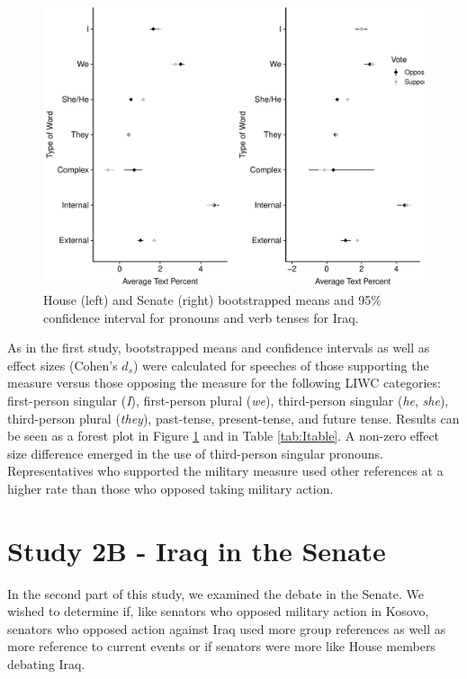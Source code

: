 \documentclass[english,,man]{apa6}
\theoremstyle{definition}
\theoremstyle{definition}
\theoremstyle{definition}
\theoremstyle{remark}
\begin{document}
\begin{figure}
\centering
\includegraphics{Language_of_War_Markdown_KJ_files/figure-latex/Ipic-1.pdf}
\caption{\label{fig:Ipic}House (left) and Senate (right) bootstrapped means
and 95\% confidence interval for pronouns and verb tenses for Iraq.}
\end{figure}

As in the first study, bootstrapped means and confidence intervals as
well as effect sizes (Cohen's \(d_s\)) were calculated for speeches of
those supporting the measure versus those opposing the measure for the
following LIWC categories: first-person singular (\emph{I}),
first-person plural (\emph{we}), third-person singular (\emph{he},
\emph{she}), third-person plural (\emph{they}), past-tense,
present-tense, and future tense. Results can be seen as a forest plot in
Figure \ref{fig:Ipic} and in Table \ref{tab:Itable}. A non-zero effect
size difference emerged in the use of third-person singular pronouns.
Representatives who supported the military measure used other references
at a higher rate than those who opposed taking military action.

\hypertarget{study-2b---iraq-in-the-senate}{%
\section{Study 2B - Iraq in the
Senate}\label{study-2b---iraq-in-the-senate}}

In the second part of this study, we examined the debate in the Senate.
We wished to determine if, like senators who opposed military action in
Kosovo, senators who opposed action against Iraq used more group
references as well as more reference to current events or if senators
were more like House members debating Iraq.
\end{document}
